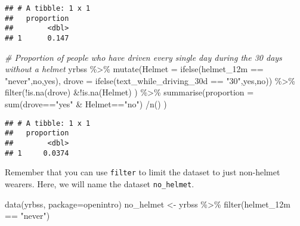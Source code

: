\documentclass[
]{article}
\newenvironment{Shaded}{\begin{snugshade}}{\end{snugshade}}
\newcommand{\AttributeTok}[1]{\textcolor[rgb]{0.77,0.63,0.00}{#1}}
\newcommand{\CommentTok}[1]{\textcolor[rgb]{0.56,0.35,0.01}{\textit{#1}}}
\newcommand{\FunctionTok}[1]{\textcolor[rgb]{0.00,0.00,0.00}{#1}}
\newcommand{\NormalTok}[1]{#1}
\newcommand{\OtherTok}[1]{\textcolor[rgb]{0.56,0.35,0.01}{#1}}
\newcommand{\SpecialCharTok}[1]{\textcolor[rgb]{0.00,0.00,0.00}{#1}}
\newcommand{\StringTok}[1]{\textcolor[rgb]{0.31,0.60,0.02}{#1}}
\begin{document}
\begin{verbatim}
## # A tibble: 1 x 1
##   proportion
##        <dbl>
## 1      0.147
\end{verbatim}

\begin{Shaded}
\begin{Highlighting}[]
\CommentTok{\# Proportion of people who have driven every single day during the 30 days without a helmet }
\NormalTok{yrbss }\SpecialCharTok{\%\textgreater{}\%}
\FunctionTok{mutate}\NormalTok{(}\AttributeTok{Helmet =} \FunctionTok{ifelse}\NormalTok{(helmet\_12m }\SpecialCharTok{==} \StringTok{"never"}\NormalTok{,}\StringTok{\textquotesingle{}no\textquotesingle{}}\NormalTok{,}\StringTok{\textquotesingle{}yes\textquotesingle{}}\NormalTok{), }\AttributeTok{drove =} \FunctionTok{ifelse}\NormalTok{(text\_while\_driving\_30d }\SpecialCharTok{==} \StringTok{"30"}\NormalTok{,}\StringTok{\textquotesingle{}yes\textquotesingle{}}\NormalTok{,}\StringTok{\textquotesingle{}no\textquotesingle{}}\NormalTok{)) }\SpecialCharTok{\%\textgreater{}\%}
\FunctionTok{filter}\NormalTok{(}\SpecialCharTok{!}\FunctionTok{is.na}\NormalTok{(drove) }\SpecialCharTok{\&!}\FunctionTok{is.na}\NormalTok{(Helmet) ) }\SpecialCharTok{\%\textgreater{}\%}
\FunctionTok{summarise}\NormalTok{(}\AttributeTok{proportion =} \FunctionTok{sum}\NormalTok{(drove}\SpecialCharTok{==}\StringTok{"yes"} \SpecialCharTok{\&}\NormalTok{ Helmet}\SpecialCharTok{==}\StringTok{"no"}\NormalTok{) }\SpecialCharTok{/}\FunctionTok{n}\NormalTok{() )}
\end{Highlighting}
\end{Shaded}

\begin{verbatim}
## # A tibble: 1 x 1
##   proportion
##        <dbl>
## 1     0.0374
\end{verbatim}

Remember that you can use \texttt{filter} to limit the dataset to just
non-helmet wearers. Here, we will name the dataset \texttt{no\_helmet}.

\begin{Shaded}
\begin{Highlighting}[]
\FunctionTok{data}\NormalTok{(}\StringTok{\textquotesingle{}yrbss\textquotesingle{}}\NormalTok{, }\AttributeTok{package=}\StringTok{\textquotesingle{}openintro\textquotesingle{}}\NormalTok{)}
\NormalTok{no\_helmet }\OtherTok{\textless{}{-}}\NormalTok{ yrbss }\SpecialCharTok{\%\textgreater{}\%}
  \FunctionTok{filter}\NormalTok{(helmet\_12m }\SpecialCharTok{==} \StringTok{"never"}\NormalTok{)}
\end{Highlighting}
\end{Shaded}
\end{document}
